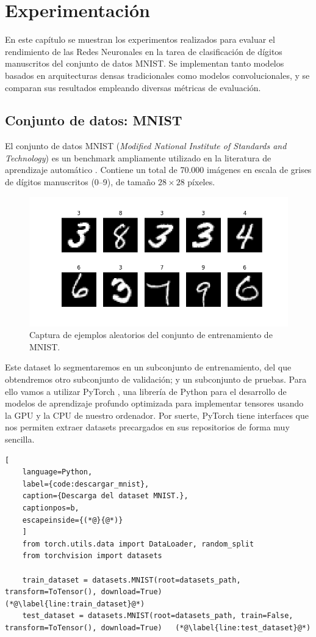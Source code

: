\chapter{Experimentación}\label{cap:experimentacion}

En este capítulo se muestran los experimentos realizados para evaluar el rendimiento de las Redes Neuronales en la tarea de clasificación de dígitos manuscritos del conjunto de datos MNIST.
Se implementan tanto modelos basados en arquitecturas densas tradicionales como modelos convolucionales, y se comparan sus resultados empleando diversas métricas de evaluación.

\section{Conjunto de datos: MNIST}

El conjunto de datos MNIST (\textit{Modified National Institute of Standards and Technology}) es un benchmark ampliamente utilizado en la literatura de aprendizaje automático \cite{yolo_docs__2024}.
Contiene un total de 70.000 imágenes en escala de grises de dígitos manuscritos (0–9), de tamaño $28 \times 28$ píxeles.

\begin{figure}[h]
	\centering
	\includegraphics[width=0.6\linewidth]{figures/ejemplos/MNIST_examples.png}
	\caption{Captura de ejemplos aleatorios del conjunto de entrenamiento de MNIST.}
	\label{fig:mnist_examples}
\end{figure}

Este dataset lo segmentaremos en un subconjunto de entrenamiento, del que obtendremos otro subconjunto de validación; y un subconjunto de pruebas. Para ello vamos a utilizar PyTorch \cite{pytorch-web}, una librería de Python para el desarrollo de modelos de aprendizaje profundo optimizada para implementar tensores usando la GPU y la CPU de nuestro ordenador. Por suerte, PyTorch tiene interfaces que nos permiten extraer datasets precargados en sus repositorios de forma muy sencilla.

\begin{lstlisting}[
	language=Python,
	label={code:descargar_mnist},
	caption={Descarga del dataset MNIST.},
	captionpos=b,
	escapeinside={(*@}{@*)}
	]
	from torch.utils.data import DataLoader, random_split
	from torchvision import datasets

	train_dataset = datasets.MNIST(root=datasets_path, transform=ToTensor(), download=True)   (*@\label{line:train_dataset}@*)
	test_dataset = datasets.MNIST(root=datasets_path, train=False, transform=ToTensor(), download=True)   (*@\label{line:test_dataset}@*)
\end{lstlisting}

